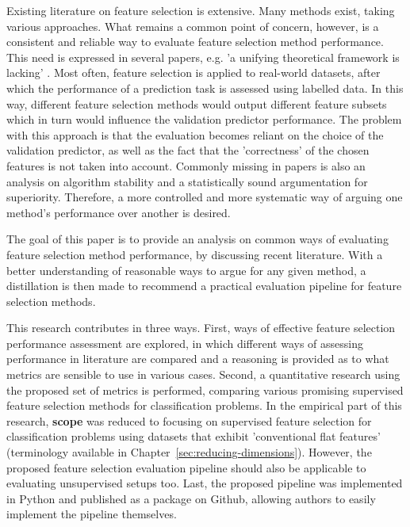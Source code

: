 \documentclass{article}
\begin{document}
Existing literature on feature selection is extensive. Many methods exist, taking various approaches. What remains a common point of concern, however, is a consistent and reliable way to evaluate feature selection method performance. This need is expressed in several papers, e.g. 'a unifying theoretical framework is lacking' \citep{guyon2003introduction}. Most often, feature selection is applied to real-world datasets, after which the performance of a prediction task is assessed using labelled data. In this way, different feature selection methods would output different feature subsets which in turn would influence the validation predictor performance. The problem with this approach is that the evaluation becomes reliant on the choice of the validation predictor, as well as the fact that the 'correctness' of the chosen features is not taken into account. Commonly missing in papers is also an analysis on algorithm stability and a statistically sound argumentation for superiority. Therefore, a more controlled and more systematic way of arguing one method's performance over another is desired.

The goal of this paper is to provide an analysis on common ways of evaluating feature selection method performance, by discussing recent literature. With a better understanding of reasonable ways to argue for any given method, a distillation is then made to recommend a practical evaluation pipeline for feature selection methods.

This research contributes in three ways. First, ways of effective feature selection performance assessment are explored, in which different ways of assessing performance in literature are compared and a reasoning is provided as to what metrics are sensible to use in various cases. Second, a quantitative research using the proposed set of metrics is performed, comparing various promising supervised feature selection methods for classification problems. In the empirical part of this research, \textbf{scope} was reduced to focusing on supervised feature selection for classification problems using datasets that exhibit 'conventional flat features' (terminology available in Chapter~\ref{sec:reducing-dimensions}). However, the proposed feature selection evaluation pipeline should also be applicable to evaluating unsupervised setups too. Last, the proposed pipeline was implemented in Python and published as a package on Github, allowing authors to easily implement the pipeline themselves.
\end{document}
